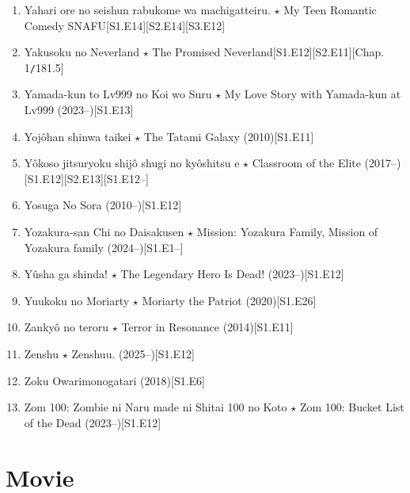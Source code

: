 \documentclass{article}
\begin{document}
\begin{enumerate}
    \item {\sc Yahari ore no seishun rabukome wa machigatteiru. $\star$ My Teen Romantic Comedy SNAFU}\hfill[S1.E14][S2.E14][S3.E12]
    \item {\sc Yakusoku no Neverland $\star$ The Promised Neverland}\hfill[S1.E12][S2.E11][Chap. 1{\tt/}181.5]
    \item Yamada-kun to Lv999 no Koi wo Suru $\star$ My Love Story with Yamada-kun at Lv999 (2023--)\hfill[S1.E13]
    \item {\sc Yojôhan shinwa taikei $\star$ The Tatami Galaxy} (2010)\hfill[S1.E11]
    \item Yôkoso jitsuryoku shijô shugi no kyôshitsu e $\star$ Classroom of the Elite (2017--)\hfill[S1.E12][S2.E13][S1.E12--]
    \item {\sc Yosuga No Sora} (2010--)\hfill[S1.E12]
    \item Yozakura-san Chi no Daisakusen $\star$ Mission: Yozakura Family, Mission of Yozakura family (2024--)\hfill[S1.E1--]
    \item {\sc Yûsha ga shinda! $\star$ The Legendary Hero Is Dead!} (2023--)\hfill[S1.E12]
    \item {\sc Yuukoku no Moriarty $\star$ Moriarty the Patriot} (2020)\hfill[S1.E26]
    \item {\sc Zankyô no teroru $\star$ Terror in Resonance} (2014)\hfill[S1.E11]
    \item {\sc Zenshu $\star$ Zenshuu.} (2025--)\hfill[S1.E12]
    \item {\sc Zoku Owarimonogatari} (2018)[S1.E6]
    \item {\sc Zom 100: Zombie ni Naru made ni Shitai 100 no Koto $\star$ Zom 100: Bucket List of the Dead} (2023--)\hfill[S1.E12]
\end{enumerate}


\section{Movie}
\end{document}
